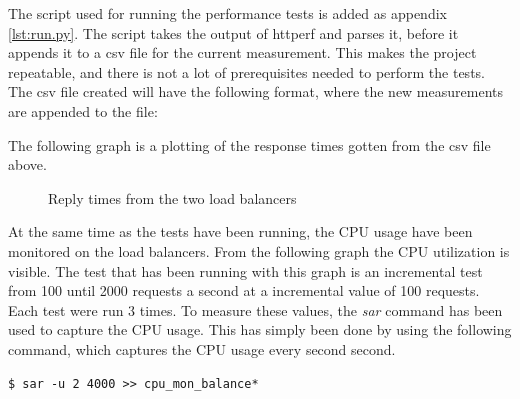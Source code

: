 The script used for running the performance tests is added as appendix
\vref{lst:run.py}. The script takes the output of httperf and parses it, before
it appends it to a csv file for the current measurement. This makes the project
repeatable, and there is not a lot of prerequisites needed to perform the tests.
The csv file created will have the following format, where the new measurements are appended to the
file:



The following graph is a plotting of the response times gotten from the csv
file above.
\begin{figure}[H]
\centering
{}
\caption{\label{fig:reply_times}Reply times from the two load balancers}
\end{figure}

At the same time as the tests have been running, the CPU usage have been
monitored on the load balancers. From the following graph the CPU utilization
is visible. The test that has been running with this graph is an incremental
test from 100 until 2000 requests a second at a incremental value of 100
requests. Each test were run 3 times. To measure these values, the \textit{sar}
command has been used to capture the CPU usage.
This has simply been done by using the following command, which captures the
CPU usage every second second.
\begin{Verbatim}[frame=none]
$ sar -u 2 4000 >> cpu_mon_balance*
\end{Verbatim}

